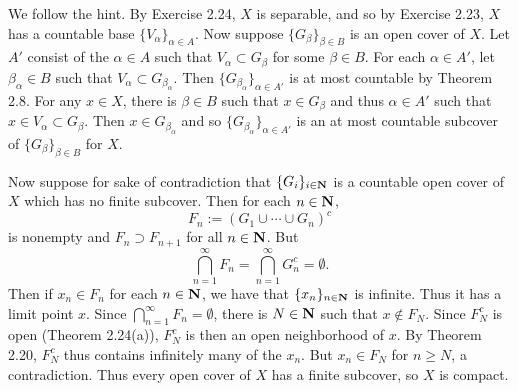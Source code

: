 \begin{ex}
We follow the hint. By Exercise 2.24, $X$ is separable, and so by Exercise 2.23, $X$ has a countable base $\{V_{\alpha}\}_{\alpha \in A}$. Now suppose $\{G_{\beta}\}_{\beta \in B}$ is an open cover of $X$. Let $A'$ consist of the $\alpha \in A$ such that $V_{\alpha} \subset G_{\beta}$ for some $\beta \in B$. For each $\alpha \in A'$, let $\beta_{\alpha} \in B$ such that $V_{\alpha} \subset G_{\beta_{\alpha}}$. Then $\{G_{\beta_{\alpha}}\}_{\alpha \in A'}$ is at most countable by Theorem 2.8. For any $x \in X$, there is $\beta \in B$ such that $x \in G_{\beta}$ and thus $\alpha \in A'$ such that $x \in V_{\alpha} \subset G_{\beta}$. Then $x \in G_{\beta_{\alpha}}$ and so $\{G_{\beta_{\alpha}}\}_{\alpha \in A'}$ is an at most countable subcover of $\{G_{\beta}\}_{\beta \in B}$ for $X$.

Now suppose for sake of contradiction that $\{G_i\}_{i \in \mathbf{N}}$ is a countable open cover of $X$ which has no finite subcover. Then for each $n \in \mathbf{N}$, \[F_n := (G_1\cup\cdots\cup G_n)^c\] is nonempty and $F_n \supset F_{n+1}$ for all $n \in \mathbf{N}$. But \[\bigcap_{n = 1}^{\infty} F_n = \bigcap_{n = 1}^{\infty} G_n^c = \emptyset.\] Then if $x_n \in F_n$ for each $n \in \mathbf{N}$, we have that $\{x_n\}_{n \in \mathbf{N}}$ is infinite. Thus it has a limit point $x$. Since $\bigcap_{n = 1}^{\infty}F_n = \emptyset$, there is $N \in \mathbf{N}$ such that $x \not \in F_N$. Since $F_N^c$ is open (Theorem 2.24(a)), $F_N^c$ is then an open neighborhood of $x$. By Theorem 2.20, $F_N^c$ thus contains infinitely many of the $x_n$. But $x_n \in F_N$ for $n \geq N$, a contradiction. Thus every open cover of $X$ has a finite subcover, so $X$ is compact.
\end{ex}

